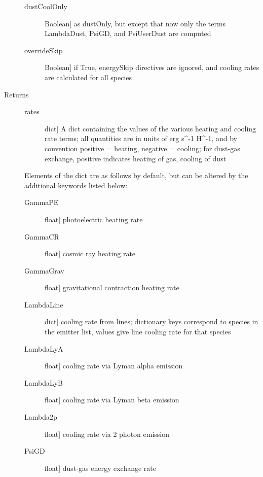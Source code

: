 \documentclass[letterpaper,10pt,english]{sphinxmanual}
\begin{document}
\begin{fulllineitems}
\begin{fulllineitems}
\begin{description}
\begin{description}
\item[{dustCoolOnly}] \leavevmode{[}Boolean{]}
as dustOnly, but except that now only the terms
LambdaDust, PsiGD, and PsiUserDust are computed

\item[{overrideSkip}] \leavevmode{[}Boolean{]}
if True, energySkip directives are ignored, and cooling
rates are calculated for all species

\end{description}

\item[{Returns}] \leavevmode\begin{description}
\item[{rates}] \leavevmode{[}dict{]}
A dict containing the values of the various heating and
cooling rate terms; all quantities are in units of erg s\textasciicircum{}-1
H\textasciicircum{}-1, and by convention positive = heating, negative =
cooling; for dust-gas exchange, positive indicates heating
of gas, cooling of dust

\end{description}

Elements of the dict are as follows by default, but can be
altered by the additional keywords listed below:
\begin{description}
\item[{GammaPE}] \leavevmode{[}float{]}
photoelectric heating rate

\item[{GammaCR}] \leavevmode{[}float{]}
cosmic ray heating rate

\item[{GammaGrav}] \leavevmode{[}float{]}
gravitational contraction heating rate

\item[{LambdaLine}] \leavevmode{[}dict{]}
cooling rate from lines; dictionary keys correspond to
species in the emitter list, values give line cooling
rate for that species

\item[{LambdaLyA}] \leavevmode{[}float{]}
cooling rate via Lyman alpha emission

\item[{LambdaLyB}] \leavevmode{[}float{]}
cooling rate via Lyman beta emission

\item[{Lambda2p}] \leavevmode{[}float{]}
cooling rate via 2 photon emission

\item[{PsiGD}] \leavevmode{[}float{]}
dust-gas energy exchange rate


\end{description}
\end{description}
\end{fulllineitems}
\end{fulllineitems}
\end{document}
